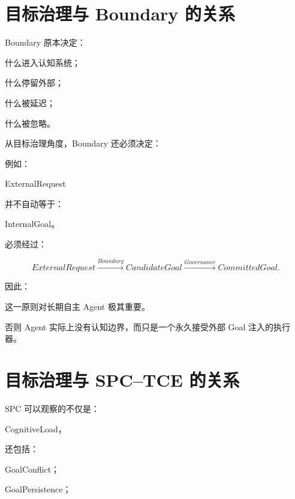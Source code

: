 \begin{statementbox}
\centering
{}
\end{statementbox}


\section{目标治理与 Boundary 的关系}

Boundary 原本决定：

什么进入认知系统；

什么停留外部；

什么被延迟；

什么被忽略。

从目标治理角度，Boundary 还必须决定：

\begin{statementbox}
\centering
{}
\end{statementbox}

例如：

ExternalRequest

并不自动等于：

InternalGoal。

必须经过：

\[
ExternalRequest
\xrightarrow{Boundary}
CandidateGoal
\xrightarrow{Governance}
CommittedGoal.
\]

因此：

\begin{statementbox}
\centering
{}
\end{statementbox}

这一原则对长期自主 Agent 极其重要。

否则 Agent 实际上没有认知边界，而只是一个永久接受外部 Goal 注入的执行器。


\section{目标治理与 SPC--TCE 的关系}

SPC 可以观察的不仅是：

CognitiveLoad，

还包括：

GoalConflict；

GoalPersistence；

